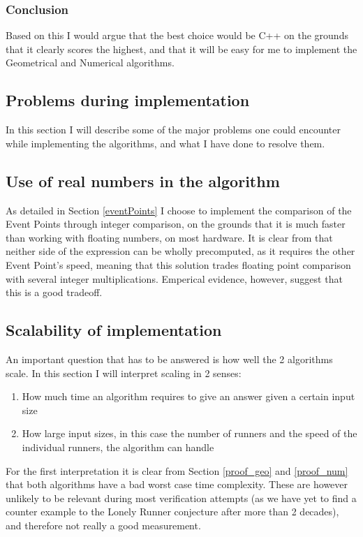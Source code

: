 \subsubsection{Conclusion}
Based on this I would argue that the best choice would be C++ on the grounds that it clearly scores the highest, and that it will be easy for me to implement the Geometrical and Numerical algorithms.

\subsection{Problems during implementation}
In this section I will describe some of the major problems one could encounter while implementing the algorithms, and what I have done to resolve them.

\subsection{Use of real numbers in the algorithm}
As detailed in Section \ref{eventPoints} I choose to implement the comparison of the Event Points through integer comparison, on the grounds that it is much faster than working with floating numbers, on most hardware. It is clear from  that neither side of the expression can be wholly precomputed, as it requires the other Event Point's speed, meaning that this solution trades floating point comparison with several integer multiplications. Emperical evidence, however, suggest that this is a good tradeoff.

\subsection{Scalability of implementation}
\label{scale}
An important question that has to be answered is how well the 2 algorithms scale. In this section I will interpret scaling in 2 senses:
\begin{enumerate}
\item How much time an algorithm requires to give an answer given a certain input size
\item How large input sizes, in this case the number of runners and the speed of the individual runners, the algorithm can handle
\end{enumerate}

For the first interpretation it is clear from Section \ref{proof_geo} and \ref{proof_num} that both algorithms have a bad worst case time complexity. These are however unlikely to be relevant during most verification attempts (as we have yet to find a counter example to the Lonely Runner conjecture after more than 2 decades), and therefore not really a good measurement. 

